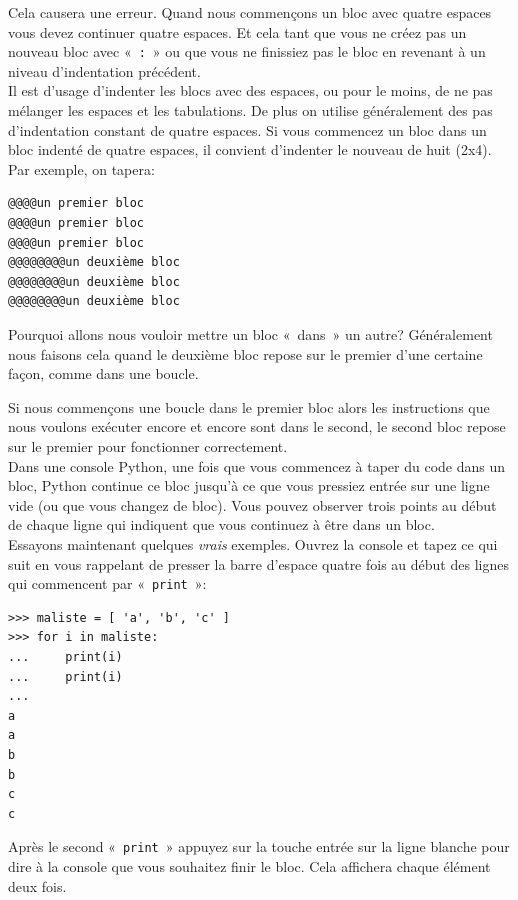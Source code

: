 Cela causera une erreur. Quand nous commençons un bloc avec quatre espaces vous devez continuer quatre espaces. Et cela tant que vous ne créez pas un nouveau bloc avec «~\verb+:+~» ou que vous ne finissiez pas le bloc en revenant à un niveau d'indentation précédent.\\

Il est d'usage d'indenter les blocs avec des espaces, ou pour le moins, de ne pas mélanger les espaces et les tabulations. De plus on utilise généralement des pas d'indentation constant de quatre espaces.
Si vous commencez un bloc dans un bloc indenté de quatre espaces, il convient d'indenter le nouveau de huit (2x4).
Par exemple, on tapera:

\begin{Verbatim}[frame=single,rulecolor=\color{gray}, label=ne pas saisir]
@@@@un premier bloc
@@@@un premier bloc
@@@@un premier bloc
@@@@@@@@un deuxième bloc
@@@@@@@@un deuxième bloc
@@@@@@@@un deuxième bloc
\end{Verbatim}

Pourquoi allons nous vouloir mettre un bloc «~dans~» un autre? Généralement nous faisons cela quand le deuxième bloc repose sur le premier d'une certaine façon, comme dans une boucle.

Si nous commençons une boucle dans le premier bloc alors les instructions que nous voulons exécuter encore et encore sont dans le second, le second bloc repose sur le premier pour fonctionner correctement.\\

Dans une console Python, une fois que vous commencez à taper du code dans un bloc, Python continue ce bloc jusqu'à ce que vous pressiez entrée sur une ligne vide (ou que vous changez de bloc). Vous pouvez observer trois points au début de chaque ligne qui indiquent que vous continuez à être dans un bloc.\\

Essayons maintenant quelques \emph{vrais} exemples. Ouvrez la console et tapez ce qui suit en vous rappelant de presser la barre d'espace quatre fois au début des lignes qui commencent par «~\texttt{print}~»:

\begin{Verbatim}[frame=single,rulecolor=\color{green}, label=à saisir avec attention]
>>> maliste = [ 'a', 'b', 'c' ]
>>> for i in maliste:
...     print(i)
...     print(i)
...
a
a
b
b
c
c
\end{Verbatim} 

Après le second «~\texttt{print}~» appuyez sur la touche entrée sur la ligne blanche pour dire à la console que vous souhaitez finir le bloc. Cela affichera chaque élément deux fois.\\

